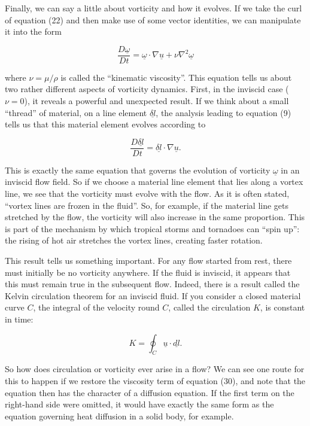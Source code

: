   Finally, we can say a little about vorticity and how it evolves. If we take 
  the curl of equation (22) and then make use of some vector identities, we can 
  manipulate it into the form 

  $$\dfrac{D \underline{\omega}}{Dt}=\underline{\omega} \cdot 
  \nabla\underline{u} + \nu \nabla^2 \underline{\omega} \tag{30}$$ 

  where $\nu=\mu/\rho$ is called the ``kinematic viscosity''. This equation 
  tells us about two rather different aspects of vorticity dynamics. First, in 
  the inviscid case ($\nu=0$), it reveals a powerful and unexpected result. If 
  we think about a small ``thread'' of material, on a line element 
  $\underline{\delta l}$, the analysis leading to equation (9) tells us that 
  this material element evolves according to 

  $$\dfrac{D \underline{\delta l}}{Dt}=\underline{\delta l} \cdot 
  \nabla\underline{u} . \tag{31}$$ 

  This is exactly the same equation that governs the evolution of vorticity 
  $\underline{\omega}$ in an inviscid flow field. So if we choose a material 
  line element that lies along a vortex line, we see that the vorticity must 
  evolve with the flow. As it is often stated, ``vortex lines are frozen in the 
  fluid''. So, for example, if the material line gets stretched by the flow, 
  the vorticity will also increase in the same proportion. This is part of the 
  mechanism by which tropical storms and tornadoes can ``spin up'': the rising 
  of hot air stretches the vortex lines, creating faster rotation. 

  This result tells us something important. For any flow started from rest, 
  there must initially be no vorticity anywhere. If the fluid is inviscid, it 
  appears that this must remain true in the subsequent flow. Indeed, there is a 
  result called the Kelvin circulation theorem for an inviscid fluid. If you 
  consider a closed material curve $C$, the integral of the velocity round $C$, 
  called the circulation $K$, is constant in time: 

  $$K=\oint_C{\underline{u} \cdot \underline{dl}} . \tag{32}$$ 

  So how does circulation or vorticity ever arise in a flow? We can see one 
  route for this to happen if we restore the viscosity term of equation (30), 
  and note that the equation then has the character of a diffusion equation. If 
  the first term on the right-hand side were omitted, it would have exactly the 
  same form as the equation governing heat diffusion in a solid body, for 
  example. 

